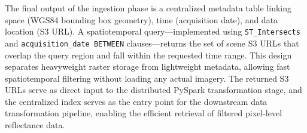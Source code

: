 The final output of the ingestion phase is a centralized metadata table linking space (WGS84 bounding box geometry), time (acquisition date), and data location (S3 URL). A spatiotemporal query—implemented using \texttt{ST\_Intersects} and \texttt{acquisition\_date BETWEEN} clauses—returns the set of scene S3 URLs that overlap the query region and fall within the requested time range. This design separates heavyweight raster storage from lightweight metadata, allowing fast spatiotemporal filtering without loading any actual imagery. The returned S3 URLs serve as direct input to the distributed PySpark transformation stage, and the centralized index serves as the entry point for the downstream data transformation pipeline, enabling the efficient retrieval of filtered pixel-level reflectance data.